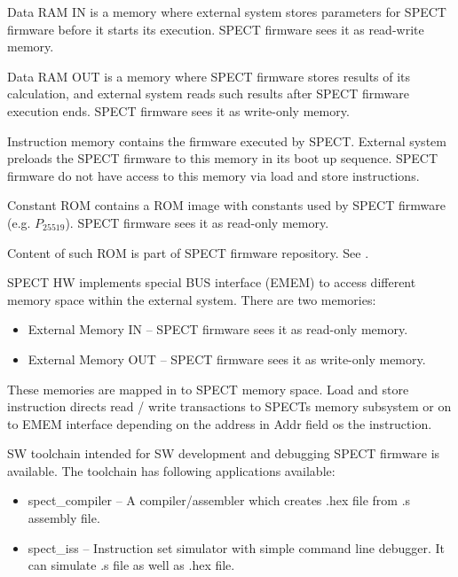 \documentclass{tropic_design_spec}
\begin{document}
Data RAM IN is a memory where external system stores parameters for SPECT firmware
before it starts its execution. SPECT firmware sees it as read-write memory.


Data RAM OUT is a memory where SPECT firmware stores results of its calculation,
and external system reads such results after SPECT firmware execution ends. SPECT
firmware sees it as write-only memory.


Instruction memory contains the firmware executed by SPECT. External system preloads
the SPECT firmware to this memory in its boot up sequence.
SPECT firmware do not have access to this memory via load and store instructions. 


Constant ROM contains a ROM image with constants used by SPECT firmware (e.g. $P_{25519}$).
SPECT firmware sees it as read-only memory.

Content of such ROM is part of SPECT firmware repository. See \cite{SPECTFW}.


SPECT HW implements special BUS interface (EMEM) to access different memory space within the external system.
There are two memories:
\begin{itemize}
    \item External Memory IN -- SPECT firmware sees it as read-only memory.
    \item External Memory OUT -- SPECT firmware sees it as write-only memory.
\end{itemize}

These memories are mapped in to SPECT memory space. Load and store instruction directs read / write transactions to
SPECTs memory subsystem or on to EMEM interface depending on the address in Addr field os the instruction.


SW toolchain intended for SW development and debugging SPECT firmware is available. The toolchain
has following applications available:

\begin{itemize}
    \item{spect_compiler} -- A compiler/assembler which creates .hex file from .s
                            assembly file.
    \item{spect_iss} -- Instruction set simulator with simple command line debugger.
                       It can simulate .s file as well as .hex file.
\end{itemize}
\end{document}
